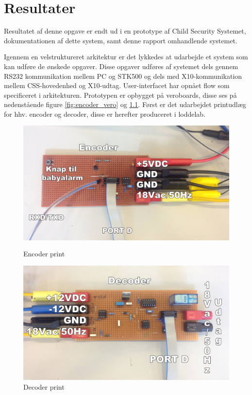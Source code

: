 \chapter{Resultater}
Resultatet af denne opgave er endt ud i en prototype af Child Security Systemet, dokumentationen af dette system, samt denne rapport omhandlende systemet.  

Igennem en velstruktureret arkitektur er det lykkedes at udarbejde et system som kan udføre de ønskede opgaver. Disse opgaver udføres af systemet dels gennem RS232 kommunikation mellem PC og STK500 og dels med X10-kommunikation mellem CSS-hovedenhed og X10-udtag. User-interfacet har opnået flow som specificeret i arkitekturen. 
Prototypen er opbygget på veroboards, disse ses på nedenstående figure \ref{fig:encoder_vero} og \ref{fig:decoder_vero}. Først er det udarbejdet printudlæg for hhv. encoder og decoder, disse er herefter produceret i loddelab. 

\begin{figure}[htb]
  \begin{minipage}{0.5\textwidth}
    \centering
      \includegraphics[width=\textwidth]{billeder/encoderveroboard}
      \caption{Encoder print}
    \label{fig:encoder_vero}
  \end{minipage}
  \hspace{0.1\textwidth}
  \begin{minipage}{0.5\textwidth}
    \centering
      \includegraphics[width=\textwidth]{billeder/decoderveroboard}
      \caption{Decoder print}
    \label{fig:decoder_vero}
  \end{minipage}
\end{figure}

